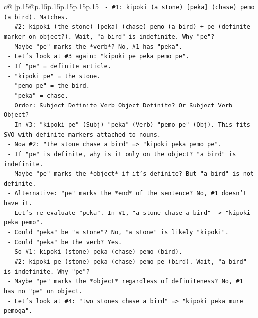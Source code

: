 \documentclass{article}
\begin{document}
{\begin{supertabular}{c@{$\;$}|p{.15\linewidth}@{}p{.15\linewidth}p{.15\linewidth}p{.15\linewidth}p{.15\linewidth}p{.15\linewidth}}
{{{\texttt{      {-} \#1: kipoki (a stone) {[}peka{]} (chase) pemo (a bird). Matches.} \\
\texttt{      {-} \#2: kipoki (the stone) {[}peka{]} (chase) pemo (a bird) + pe (definite marker on object?). Wait, "a bird" is indefinite. Why "pe"?} \\
\texttt{      {-} Maybe "pe" marks the *verb*? No, \#1 has "peka".} \\
\texttt{      {-} Let's look at \#3 again: "kipoki pe peka pemo pe".} \\
\texttt{        {-} If "pe" = definite article.} \\
\texttt{        {-} "kipoki pe" = the stone.} \\
\texttt{        {-} "pemo pe" = the bird.} \\
\texttt{        {-} "peka" = chase.} \\
\texttt{        {-} Order: Subject Definite Verb Object Definite? Or Subject Verb Object?} \\
\texttt{        {-} In \#3: "kipoki pe" (Subj) "peka" (Verb) "pemo pe" (Obj). This fits SVO with definite markers attached to nouns.} \\
\texttt{      {-} Now \#2: "the stone chase a bird" => "kipoki peka pemo pe".} \\
\texttt{        {-} If "pe" is definite, why is it only on the object? "a bird" is indefinite.} \\
\texttt{        {-} Maybe "pe" marks the *object* if it's definite? But "a bird" is not definite.} \\
\texttt{        {-} Alternative: "pe" marks the *end* of the sentence? No, \#1 doesn't have it.} \\
\texttt{        {-} Let's re{-}evaluate "peka". In \#1, "a stone chase a bird" {-}> "kipoki peka pemo".} \\
\texttt{          {-} Could "peka" be "a stone"? No, "a stone" is likely "kipoki".} \\
\texttt{          {-} Could "peka" be the verb? Yes.} \\
\texttt{          {-} So \#1: kipoki (stone) peka (chase) pemo (bird).} \\
\texttt{          {-} \#2: kipoki pe (stone) peka (chase) pemo pe (bird). Wait, "a bird" is indefinite. Why "pe"?} \\
\texttt{          {-} Maybe "pe" marks the *object* regardless of definiteness? No, \#1 has no "pe" on object.} \\
\texttt{          {-} Let's look at \#4: "two stones chase a bird" => "kipoki peka mure pemoga".} \\
}}}
\end{supertabular}}
\end{document}
